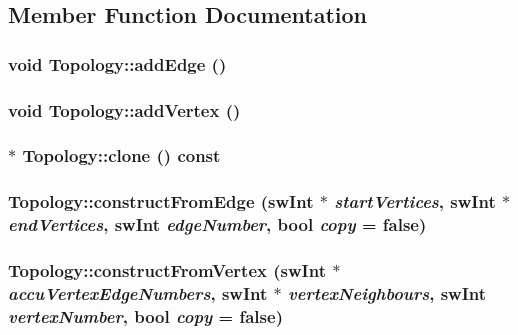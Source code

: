 \subsection{Member Function Documentation}
\hypertarget{classTopology_ab38dc5ab7bd2e7f88e067bc065c5cd94}{
\subsubsection[{addEdge}]{\setlength{\rightskip}{0pt plus 5cm}void Topology::addEdge ()}}
\label{classTopology_ab38dc5ab7bd2e7f88e067bc065c5cd94}
\hypertarget{classTopology_a6675efbf0f6f4298edfd96746ec83ebf}{
\subsubsection[{addVertex}]{\setlength{\rightskip}{0pt plus 5cm}void Topology::addVertex ()}}
\label{classTopology_a6675efbf0f6f4298edfd96746ec83ebf}
\hypertarget{classTopology_a3682f43de839774aea84e68cc8a72c4c}{
\subsubsection[{clone}]{$\ast$ Topology::clone () const}}
\label{classTopology_a3682f43de839774aea84e68cc8a72c4c}
\hypertarget{classTopology_aa80e5ef0bdfb3a1110b138f67ca2095d}{
\subsubsection[{constructFromEdge}]{ Topology::constructFromEdge ({\bf swInt} $\ast$ {\em startVertices}, \/  {\bf swInt} $\ast$ {\em endVertices}, \/  {\bf swInt} {\em edgeNumber}, \/  bool {\em copy} = {\ttfamily false})}}
\label{classTopology_aa80e5ef0bdfb3a1110b138f67ca2095d}
\hypertarget{classTopology_adda62b196db7dd8bcaa619b4c93f3fa4}{
\subsubsection[{constructFromVertex}]{ Topology::constructFromVertex ({\bf swInt} $\ast$ {\em accuVertexEdgeNumbers}, \/  {\bf swInt} $\ast$ {\em vertexNeighbours}, \/  {\bf swInt} {\em vertexNumber}, \/  bool {\em copy} = {\ttfamily false})}}
